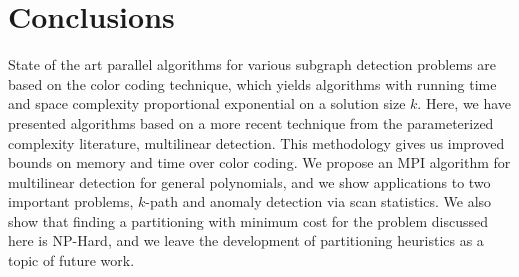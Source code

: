 \section{Conclusions}
\label{sec:conc}
State of the art parallel algorithms for various subgraph detection problems are based on the color coding technique, which yields algorithms with running time and space complexity proportional exponential on a solution size $k$. Here, we have presented algorithms based on a more recent technique from the parameterized complexity literature, multilinear detection. This methodology gives us improved bounds on memory and time over color coding. We propose an MPI algorithm for multilinear detection for general polynomials, and we show applications to two important problems, $k$-path and anomaly detection via scan statistics. We also show that finding a partitioning with minimum cost for the problem discussed here is NP-Hard, and we leave the development of partitioning heuristics as a topic of future work.